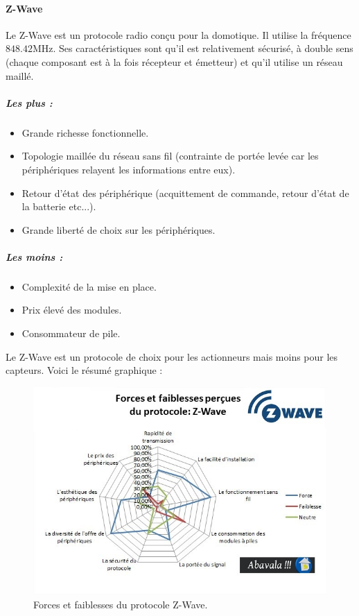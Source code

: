 \documentclass[a4paper,10pt]{article}
\begin{document}
\paragraph{Z-Wave}
Le Z-Wave est un protocole radio conçu pour la domotique. Il utilise la fréquence $848.42$MHz.
Ses caractéristiques sont qu'il est relativement sécurisé, à double sens (chaque composant est à la fois récepteur et émetteur) et qu'il utilise un réseau maillé.
\subparagraph{Les plus :}
\begin{itemize}
\item Grande richesse fonctionnelle.
\item Topologie maillée du réseau sans fil (contrainte de portée levée car les périphériques relayent les informations entre eux).
\item Retour d'état des périphérique (acquittement de commande, retour d'état de la batterie etc...).
\item Grande liberté de choix sur les périphériques.
\end{itemize}
\subparagraph{Les moins :}
\begin{itemize}
\item Complexité de la mise en place.
\item Prix élevé des modules.
\item Consommateur de pile.\newline
\end{itemize}
Le Z-Wave est un protocole de choix pour les actionneurs mais moins pour les capteurs. Voici le résumé graphique :

\begin{figure}[H]
\centering\includegraphics[scale=0.7]{forces-protocole-zwave.jpg}
\caption{Forces et faiblesses du protocole Z-Wave.}
\end{figure}
\end{document}
